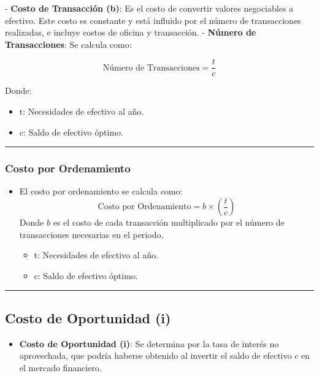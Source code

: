\documentclass[
  letterpaper,
  DIV=11,
  numbers=noendperiod]{scrartcl}
\providecommand{\tightlist}{%
  \setlength{\itemsep}{0pt}\setlength{\parskip}{0pt}}\usepackage{longtable,booktabs,array}
\begin{document}
- \textbf{Costo de Transacción (b)}: Es el costo de convertir valores
negociables a efectivo. Este costo es constante y está influido por el
número de transacciones realizadas, e incluye costos de oficina y
transacción. - \textbf{Número de Transacciones}: Se calcula como:

\[ 
  \text{Número de Transacciones} = \frac{t}{c} 
  \]

Donde:

\begin{itemize}
\tightlist
\item
  t: Necesidades de efectivo al año.
\item
  c: Saldo de efectivo óptimo.
\end{itemize}

\begin{center}\rule{0.5\linewidth}{0.5pt}\end{center}

\subsubsection{Costo por Ordenamiento}\label{costo-por-ordenamiento}

\begin{itemize}
\tightlist
\item
  El costo por ordenamiento se calcula como: \[
    \text{Costo por Ordenamiento} = b \times \left( \frac{t}{c} \right)
    \] Donde \(b\) es el costo de cada transacción multiplicado por el
  número de transacciones necesarias en el periodo.

  \begin{itemize}
  \tightlist
  \item
    t: Necesidades de efectivo al año.
  \item
    c: Saldo de efectivo óptimo.
  \end{itemize}
\end{itemize}

\begin{center}\rule{0.5\linewidth}{0.5pt}\end{center}

\subsection{Costo de Oportunidad (i)}\label{costo-de-oportunidad-i}

\begin{itemize}
\tightlist
\item
  \textbf{Costo de Oportunidad (i)}: Se determina por la tasa de interés
  no aprovechada, que podría haberse obtenido al invertir el saldo de
  efectivo \(c\) en el mercado financiero.
\end{itemize}
\end{document}
